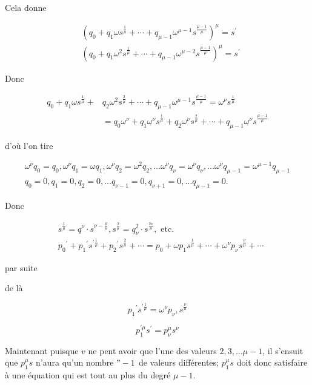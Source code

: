 \documentclass{article}
\begin{document}
Cela donne

\[
\begin{aligned}
& \left(q_{0}+q_{1} \omega s^{\frac{1}{\mu}}+\cdots+q_{\mu-1} \omega^{\mu-1} s^{\frac{\mu-1}{\mu}}\right)^{\mu}=s^{\prime} \\
& \left(q_{0}+q_{1} \omega^{2} s^{\frac{1}{\mu}}+\cdots+q_{\mu-1} \omega^{\mu-2} s^{\frac{\mu-1}{\mu}}\right)^{\mu}=s^{\prime}
\end{aligned}
\]

Donc

\[
\begin{aligned}
q_{0}+q_{1} \omega s^{\frac{1}{\mu}}+ & q_{2} \omega^{2} s^{\frac{2}{\mu}}+\cdots+q_{\mu-1} \omega^{\mu-1} s^{\frac{\mu-1}{\mu}}=\omega^{\nu} s^{\frac{1}{\mu}} \\
& =q_{0} \omega^{\nu}+q_{1} \omega^{\nu} s^{\frac{1}{\mu}}+q_{2} \omega^{\nu} s^{\frac{2}{\mu}}+\cdots+q_{\mu-1} \omega^{\nu} s^{\frac{\mu-1}{\mu}}
\end{aligned}
\]

d'où l'on tire

\[
\begin{gathered}
\omega^{\nu} q_{0}=q_{0}, \omega^{\nu} q_{1}=\omega q_{1}, \omega^{\nu} q_{2}=\omega^{2} q_{2}, \ldots \omega^{\nu} q_{\nu}=\omega^{\nu} q_{\nu}, \ldots \omega^{\nu} q_{\mu-1}=\omega^{\mu-1} q_{\mu-1} \\
q_{0}=0, q_{1}=0, q_{2}=0, \ldots q_{\nu-1}=0, q_{\nu+1}=0, \ldots q_{\mu-1}=0 .
\end{gathered}
\]

Donc

\[
\begin{aligned}
& s^{\frac{1}{\mu}}=q^{\nu} \cdot s^{\nu-\frac{\mu}{\mu}}, s^{\frac{2}{\mu}}=q_{\nu}^{2} \cdot s^{\frac{2 \nu}{\mu}}, \text { etc. } \\
& p_{0}{ }^{\prime}+p_{1}{ }^{\prime} s^{\prime \frac{1}{\mu}}+p_{2}{ }^{\prime} s^{\frac{2}{\mu}}+\cdots=p_{0}+\omega p_{1} s^{\frac{1}{\mu}}+\cdots+\omega^{\nu} p_{\nu} s^{\frac{\nu}{\mu}}+\cdots
\end{aligned}
\]

par suite

de là

\[
p_{1}{ }^{\prime} s^{\prime \frac{1}{\mu}}=\omega^{\nu} p_{\nu}, s^{\frac{\nu}{\mu}}
\]

\[
p_{1}^{\prime \mu} s^{\prime}=p_{\nu}^{\mu} s^{\nu}
\]

Maintenant puisque \(v\) ne pent avoir que l'une des valeurs \(2,3, \ldots \mu-1\), il s'ensuit que \(p_{1}^{\mu} s\) n'aura qu'un nombre \("-1\) de valeurs différentes; \(p_{1}^{\mu} s\) doit donc satisfaire à une équation qui est tout au plus du degré \(\mu-1\).
\end{document}
